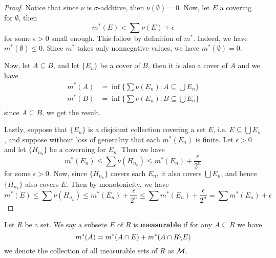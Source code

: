\begin{proof}
    Notice that since $\nu$ is  $\sigma$-additive, then  $\nu(\emptyset)=0$.
    Now, let $E$ a covering for  $\emptyset$, then
    \begin{equation*}
        m^*(E)<\sum{\nu(E)}+\epsilon
    \end{equation*}
    for some $\epsilon>0$ small enough. This follow by definition of $m^*$.
    Indeed, we have $m^*(\emptyset) \leq 0$. Since $m^*$ takes only nonnegative
    values, we have  $m^*(\emptyset)=0$.

    Now, let $A \subseteq B$, and let  $\{E_n\}$ be a cover of $B$, then it is
    also a cover of  $A$ and we have
    \begin{align*}
        m^*(A)  &=  \inf{\{\sum{\nu(E_n)} : A \subseteq \bigcup{E_n}\}}  \\
        m^*(B)  &=  \inf{\{\sum{\nu(E_n)} : B \subseteq \bigcup{E_n}\}}  \\
    \end{align*}
    since $A \subseteq B$, we get the result.

    Lastly, suppose that  $\{E_n\}$ is a disjoiunt collection covering a set
    $E$, i.e. $E \subseteq \bigcup{E_n}$, and suppose without loss of generality
    that each $m^*(E_n)$ is finite. Let $\epsilon>0$ and let  $\{H_{n_k}\}$ be a
    coverning for $E_n$. Then we have
    \begin{equation*}
        m^*(E_n) \leq \sum{\nu(H_{n_k})} \leq m^*(E_n)+\frac{\epsilon}{2^n}
    \end{equation*}
    for some $\epsilon>0$. Now, since  $\{H_{n_k}\}$ covers each $E_n$, it also
    covers $\bigcup{E_n}$, and hence $\{H_{n_k}\}$ also covers $E$. Then by
    monotonicity, we have
    \begin{equation*}
        m^*(E) \leq \sum{\nu(H_{n_k})} \leq m^*(E_n)+\frac{\epsilon}{2^n} \leq
        \sum{m^*(E_n)+\frac{\epsilon}{2^n}}=\sum{m^*(E_n)}+\epsilon
    \end{equation*}
\end{proof}

\begin{definition}
    Let $R$ be a set. We say a subsete $E$ of $R$ is  \textbf{measurable} if for
    any $A \subseteq R$ we have
    \begin{equation*}
        m^*(A)=m^*(A \cap E)+m^*(A \cap R\backslash E)
    \end{equation*}
    we denote the collection of all measurable sets of $R$ as  $\mathcal{M}$.
\end{definition}

